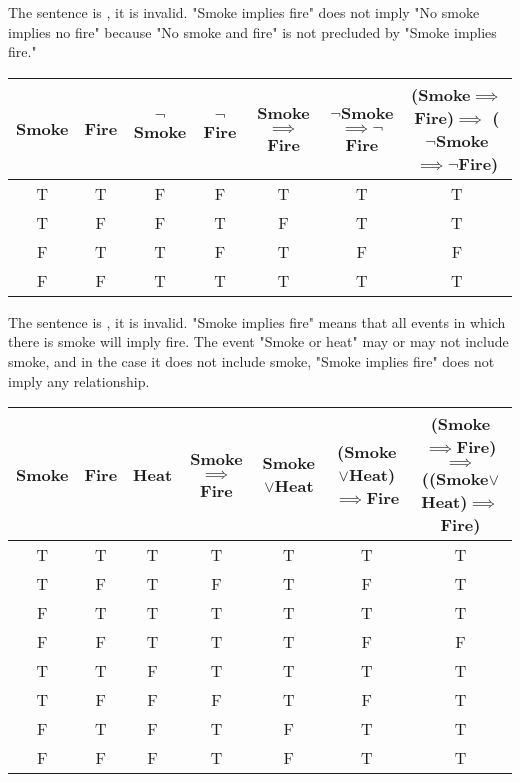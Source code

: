 \documentclass[]{homework}
\begin{document}
\maketitle

\question
\begin{alphaparts}
\questionpart The sentence is , it is invalid. "Smoke implies fire" does not imply "No smoke implies no fire" because "No smoke and fire" is not precluded by "Smoke implies fire."

\begin{tabular}{|c|c|c|c|c|c|c|}
    \hline
    Smoke & Fire & $\neg$Smoke & $\neg$Fire
    & Smoke$\implies$Fire
    & $\neg$Smoke$\implies \neg$Fire 
    & \shortstack{(Smoke$\implies$Fire)$\implies$\\($\neg$Smoke$\implies \neg$Fire)} \\
    \hline
    T & T & F & F & T & T & T \\
    T & F & F & T & F & T & T \\
    F & T & T & F & T & F & F \\
    F & F & T & T & T & T & T \\
    \hline
\end{tabular}

\questionpart The sentence is , it is invalid. "Smoke implies fire" means that all events in which there is smoke will imply fire. The event "Smoke or heat" may or may not include smoke, and in the case it does not include smoke, "Smoke implies fire" does not imply any relationship.

\begin{tabular}{|c|c|c|c|c|c|c|}
    \hline
    Smoke & Fire & Heat
    & Smoke$\implies$Fire
    & Smoke$\lor$Heat 
    & \shortstack{(Smoke$\lor$Heat)\\$\implies$Fire}
    & \shortstack{(Smoke$\implies$Fire)$\implies$ \\ ((Smoke$\lor$Heat)$\implies$Fire)} \\
    \hline
    T & T & T & T & T & T & T \\
    T & F & T & F & T & F & T \\
    F & T & T & T & T & T & T \\
    F & F & T & T & T & F & F \\
    T & T & F & T & T & T & T \\
    T & F & F & F & T & F & T \\
    F & T & F & T & F & T & T \\
    F & F & F & T & F & T & T \\
    \hline
\end{tabular}


\end{alphaparts}
\end{document}
